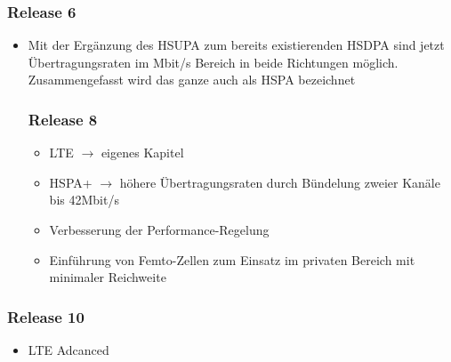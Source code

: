 \begin{minipage}{0.5\linewidth}
\subsubsection{Release 6}
\begin{itemize}
\item Mit der Ergänzung des HSUPA zum bereits existierenden HSDPA sind jetzt Übertragungsraten im Mbit/s Bereich in beide Richtungen möglich. Zusammengefasst wird das ganze auch als HSPA bezeichnet

\subsubsection{Release 8}
\begin{itemize}
\item LTE $\rightarrow$ eigenes Kapitel
\item HSPA+ $\rightarrow$ höhere Übertragungsraten durch Bündelung zweier Kanäle bis 42Mbit/s
\item Verbesserung der Performance-Regelung
\item Einführung von Femto-Zellen zum Einsatz im privaten Bereich mit minimaler Reichweite
\end{itemize}
\end{itemize}

\subsubsection{Release 10}
\begin{itemize}
\item LTE Adcanced
\end{itemize}
\end{minipage}
